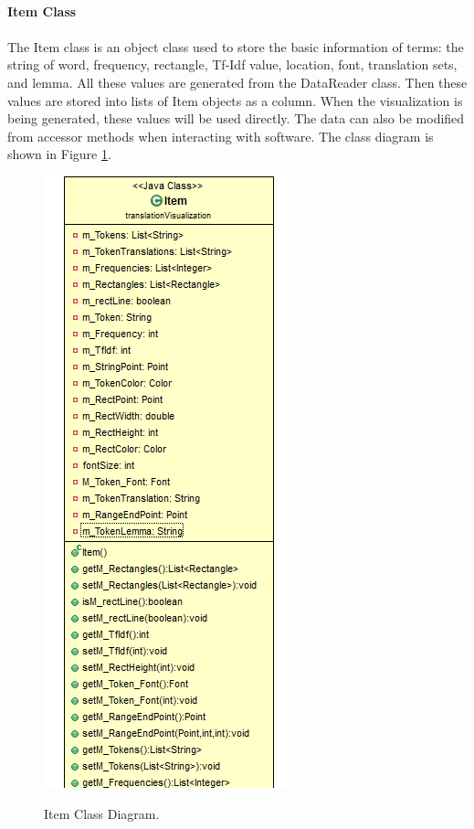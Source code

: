 \paragraph{Item Class}

\paragraph[]{}

The Item class is an object class used to store the basic information of terms: the string of word, frequency, rectangle, Tf-Idf value, location, font, translation sets, and lemma. All these values are generated from the DataReader class. Then these values are stored into lists of Item objects as a column. When the visualization is being generated, these values will be used directly. The data can also be modified from accessor methods when interacting with software. The class diagram is shown in Figure \ref*{fig:item}.

\begin{figure}[H]
	\centering    
	\includegraphics[scale=0.9]{Figs/Item}\\[1ex]
	\caption{Item Class Diagram. }
	\label{fig:item}
\end{figure}

